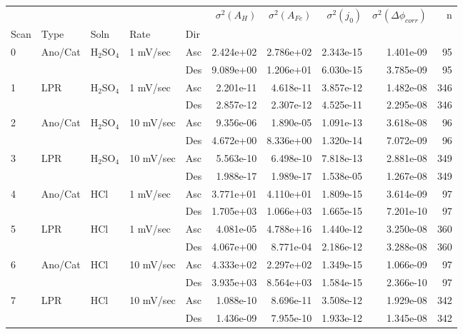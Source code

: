 \begin{tabular}{lllllrrrrr}
\toprule
  &     &     &           &     &  $\sigma^2(A_H)$ &  $\sigma^2(A_{Fe})$ &  $\sigma^2(j_0)$ &  $\sigma^2(\Delta \phi_{corr})$ &    n \\
Scan & Type & Soln & Rate & Dir &                  &                     &                  &                                 &      \\
\midrule
0 & Ano/Cat & H$_2$SO$_4$ & 1 mV/sec & Asc &        2.424e+02 &           2.786e+02 &        2.343e-15 &                       1.401e-09 &   95 \\
  &     &     &           & Des &        9.089e+00 &           1.206e+01 &        6.030e-15 &                       3.785e-09 &   95 \\
1 & LPR & H$_2$SO$_4$ & 1 mV/sec & Asc &        2.201e-11 &           4.618e-11 &        3.857e-12 &                       1.482e-08 &  346 \\
  &     &     &           & Des &        2.857e-12 &           2.307e-12 &        4.525e-11 &                       2.295e-08 &  346 \\
2 & Ano/Cat & H$_2$SO$_4$ & 10 mV/sec & Asc &        9.356e-06 &           1.890e-05 &        1.091e-13 &                       3.618e-08 &   96 \\
  &     &     &           & Des &        4.672e+00 &           8.336e+00 &        1.320e-14 &                       7.072e-09 &   96 \\
3 & LPR & H$_2$SO$_4$ & 10 mV/sec & Asc &        5.563e-10 &           6.498e-10 &        7.818e-13 &                       2.881e-08 &  349 \\
  &     &     &           & Des &        1.988e-17 &           1.989e-17 &        1.538e-05 &                       1.267e-08 &  349 \\
4 & Ano/Cat & HCl & 1 mV/sec & Asc &        3.771e+01 &           4.110e+01 &        1.809e-15 &                       3.614e-09 &   97 \\
  &     &     &           & Des &        1.705e+03 &           1.066e+03 &        1.665e-15 &                       7.201e-10 &   97 \\
5 & LPR & HCl & 1 mV/sec & Asc &        4.081e-05 &           4.788e+16 &        1.440e-12 &                       3.250e-08 &  360 \\
  &     &     &           & Des &        4.067e+00 &           8.771e-04 &        2.186e-12 &                       3.288e-08 &  360 \\
6 & Ano/Cat & HCl & 10 mV/sec & Asc &        4.333e+02 &           2.297e+02 &        1.349e-15 &                       1.066e-09 &   97 \\
  &     &     &           & Des &        3.935e+03 &           8.564e+03 &        1.584e-15 &                       2.366e-10 &   97 \\
7 & LPR & HCl & 10 mV/sec & Asc &        1.088e-10 &           8.696e-11 &        3.508e-12 &                       1.929e-08 &  342 \\
  &     &     &           & Des &        1.436e-09 &           7.955e-10 &        1.933e-12 &                       1.345e-08 &  342 \\
\bottomrule
\end{tabular}
